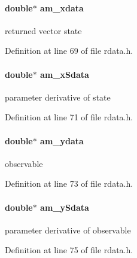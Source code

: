 \hypertarget{struct_return_data_ad99b08eb835733c2416a1a0004e4a491}{}
\paragraph[{am\+\_\+xdata}]{\setlength{\rightskip}{0pt plus 5cm}double$\ast$ am\+\_\+xdata}\label{struct_return_data_ad99b08eb835733c2416a1a0004e4a491}
returned vector state 

Definition at line 69 of file rdata.\+h.

\hypertarget{struct_return_data_a097369567440c923ac24256e75ab3e89}{}
\paragraph[{am\+\_\+x\+Sdata}]{\setlength{\rightskip}{0pt plus 5cm}double$\ast$ am\+\_\+x\+Sdata}\label{struct_return_data_a097369567440c923ac24256e75ab3e89}
parameter derivative of state 

Definition at line 71 of file rdata.\+h.

\hypertarget{struct_return_data_a24568582aa8de699ea1ce53323ff26ca}{}
\paragraph[{am\+\_\+ydata}]{\setlength{\rightskip}{0pt plus 5cm}double$\ast$ am\+\_\+ydata}\label{struct_return_data_a24568582aa8de699ea1ce53323ff26ca}
observable 

Definition at line 73 of file rdata.\+h.

\hypertarget{struct_return_data_aa2089cdd16d3cb3c9b85f99f570197d1}{}
\paragraph[{am\+\_\+y\+Sdata}]{\setlength{\rightskip}{0pt plus 5cm}double$\ast$ am\+\_\+y\+Sdata}\label{struct_return_data_aa2089cdd16d3cb3c9b85f99f570197d1}
parameter derivative of observable 

Definition at line 75 of file rdata.\+h.

